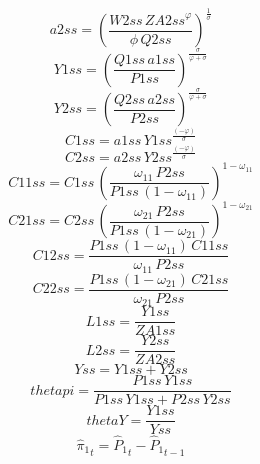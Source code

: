 \begin{dmath*}
a2ss = \left(\frac{{W2ss}\, {ZA2ss}^{{{\varphi}}}}{{{\phi}}\, {Q2ss}}\right)^{\frac{1}{{{\sigma}}}}
\end{dmath*}
\begin{dmath*}
Y1ss = \left(\frac{{Q1ss}\, {a1ss}}{{P1ss}}\right)^{\frac{{{\sigma}}}{{{\varphi}}+{{\sigma}}}}
\end{dmath*}
\begin{dmath*}
Y2ss = \left(\frac{{Q2ss}\, {a2ss}}{{P2ss}}\right)^{\frac{{{\sigma}}}{{{\varphi}}+{{\sigma}}}}
\end{dmath*}
\begin{dmath*}
C1ss = {a1ss}\, {Y1ss}^{\frac{\left(-{{\varphi}}\right)}{{{\sigma}}}}
\end{dmath*}
\begin{dmath*}
C2ss = {a2ss}\, {Y2ss}^{\frac{\left(-{{\varphi}}\right)}{{{\sigma}}}}
\end{dmath*}
\begin{dmath*}
C11ss = {C1ss}\, \left(\frac{{{\omega_{11}}}\, {P2ss}}{{P1ss}\, \left(1-{{\omega_{11}}}\right)}\right)^{1-{{\omega_{11}}}}
\end{dmath*}
\begin{dmath*}
C21ss = {C2ss}\, \left(\frac{{{\omega_{21}}}\, {P2ss}}{{P1ss}\, \left(1-{{\omega_{21}}}\right)}\right)^{1-{{\omega_{21}}}}
\end{dmath*}
\begin{dmath*}
C12ss = \frac{{P1ss}\, \left(1-{{\omega_{11}}}\right)\, {C11ss}}{{{\omega_{11}}}\, {P2ss}}
\end{dmath*}
\begin{dmath*}
C22ss = \frac{{P1ss}\, \left(1-{{\omega_{21}}}\right)\, {C21ss}}{{{\omega_{21}}}\, {P2ss}}
\end{dmath*}
\begin{dmath*}
L1ss = \frac{{Y1ss}}{{ZA1ss}}
\end{dmath*}
\begin{dmath*}
L2ss = \frac{{Y2ss}}{{ZA2ss}}
\end{dmath*}
\begin{dmath*}
Yss = {Y1ss}+{Y2ss}
\end{dmath*}
\begin{dmath*}
thetapi = \frac{{P1ss}\, {Y1ss}}{{P1ss}\, {Y1ss}+{P2ss}\, {Y2ss}}
\end{dmath*}
\begin{dmath*}
thetaY = \frac{{Y1ss}}{{Yss}}
\end{dmath*}
\begin{dmath}
{{\hat{\pi}_{1}}}_{t}={{\hat{P}_{1}}}_{t}-{{\hat{P}_{1}}}_{t-1}
\end{dmath}
